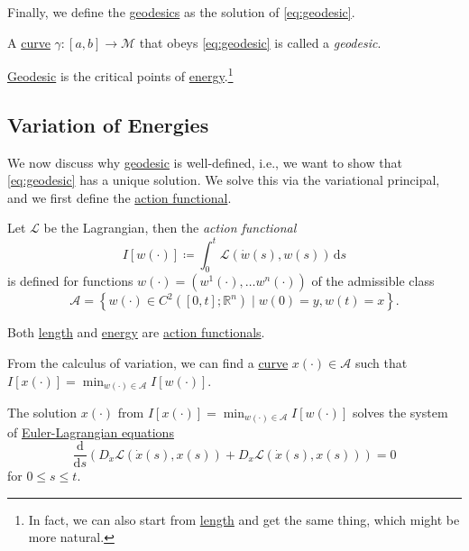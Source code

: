 Finally, we define the \hyperref[def:geodesic]{geodesics} as the solution of \autoref{eq:geodesic}.

\begin{definition}[Geodesic]\label{def:geodesic}
	A \hyperref[def:curve]{curve} \(\gamma \colon [a, b] \to \mathcal{M} \) that obeys \autoref{eq:geodesic} is called a \emph{geodesic}.
\end{definition}

\begin{intuition}
	\hyperref[def:geodesic]{Geodesic} is the critical points of \hyperref[def:energy]{energy}.\footnote{In fact, we can also start from \hyperref[def:length]{length} and get the same thing, which might be more natural.}
\end{intuition}

\subsection{Variation of Energies}
We now discuss why \hyperref[def:geodesic]{geodesic} is well-defined, i.e., we want to show that \autoref{eq:geodesic} has a unique solution. We solve this via the variational principal, and we first define the \hyperref[def:action-functional]{action functional}.

\begin{definition}\label{def:action-functional}
	Let \(\mathcal{L} \) be the Lagrangian, then the \emph{action functional}
	\[
		I[w(\cdot)] \coloneqq \int_{0}^{t} \mathcal{L} (\dot{w}(s), w(s)) \,\mathrm{d}s
	\]
	is defined for functions \(w(\cdot) = (w^1(\cdot), \dots w^n(\cdot))\) of the admissible class
	\[
		\mathcal{A} =\left\{ w(\cdot)\in C^2([0, t]; \mathbb{R} ^n) \mid w(0)= y, w(t)= x\right\}.
	\]
\end{definition}

\begin{eg}
	Both \hyperref[def:length]{length} and \hyperref[def:energy]{energy} are \hyperref[def:action-functional]{action functionals}.
\end{eg}

From the calculus of variation, we can find a \hyperref[def:curve]{curve} \(x(\cdot)\in \mathcal{A} \) such that \(I[x(\cdot)] = \min _{w(\cdot)\in \mathcal{A} }I[w(\cdot)]\).

\begin{theorem}\label{thm:Euler-Lagrangian-eq}
	The solution \(x(\cdot)\) from \(I[x(\cdot)] = \min _{w(\cdot)\in \mathcal{A} }I[w(\cdot)]\) solves the system of \href{https://en.wikipedia.org/wiki/Euler-Lagrange_equation}{Euler-Lagrangian equations}
	\[
		\frac{\mathrm{d}}{\mathrm{d}s} \left( D_{\dot{x}} \mathcal{L} (\dot{x}(s), x(s)) + D_x \mathcal{L} (\dot{x}(s), x(s)) \right) = 0
	\]
	for \(0 \leq s \leq t\).
\end{theorem}